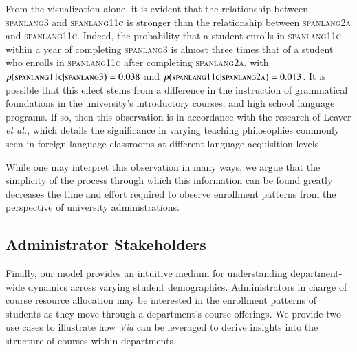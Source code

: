 \documentclass{sigchi}
\begin{document}
From the visualization alone, it is evident that the relationship
between \textsc{spanlang3} and \textsc{spanlang11c} is stronger than
the relationship between \textsc{spanlang2a} and
\textsc{spanlang11c}. Indeed, the probability that a student enrolls
in \textsc{spanlang11c} within a year of completing \textsc{spanlang3}
is almost three times that of a student who enrolls in
\textsc{spanlang11c} after completing \textsc{spanlang2a}, with
$p(\textsc{spanlang11c}|\textsc{spanlang3}) = 0.038$ and
$p(\textsc{spanlang11c}|\textsc{spanlang2a}) = 0.013$. It is possible
that this effect stems from a difference in the instruction
of grammatical foundations in the university's introductory courses, and high school language programs. If so, then this observation is in accordance with the research of Leaver \textit{et al.}, which details the significance in varying teaching philosophies commonly seen in foreign language classrooms at different language acquisition levels \cite{Leaver2002}.

While one may interpret this observation in many ways, we argue that the simplicity of the process through which this information can be found greatly decreases the time and effort required to observe enrollment patterns from the perspective of university administrations.

\subsection{Administrator Stakeholders}
\label{sec:administrative_stakeholders}

Finally, our model provides an intuitive medium for
understanding department-wide dynamics across varying student
demographics. Administrators in charge of course resource allocation
may be interested in the enrollment patterns of students as they move
through a department's course offerings. We provide two use cases to illustrate how \textit{Via} can be leveraged to derive insights into the structure of courses within departments.
\end{document}

